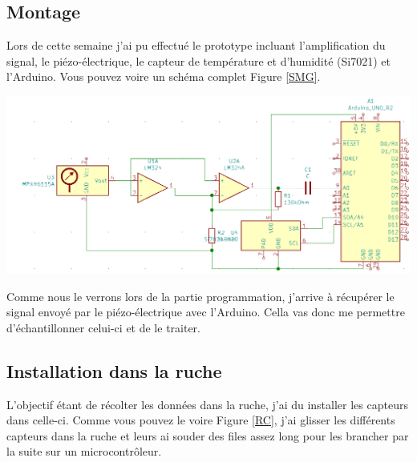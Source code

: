 \documentclass[11pt,french,a4paper]{article}
\begin{document}
\subsection{Montage}
Lors de cette semaine j'ai pu effectué le prototype incluant l'amplification du signal, le piézo-électrique, le capteur de température et d'humidité (Si7021) et l'Arduino. Vous pouvez voire un schéma complet Figure \ref{SMG}.
\\
\begin{center}
    \includegraphics[scale=0.5]{../img/SMG.png}
    \label{SMG}
\end{center}
Comme nous le verrons lors de la partie programmation, j'arrive à récupérer le signal envoyé par le piézo-électrique avec l'Arduino. Cella vas donc me permettre d'échantillonner celui-ci et de le traiter.
\subsection{Installation dans la ruche}
L'objectif étant de récolter les données dans la ruche, j'ai du installer les capteurs dans celle-ci. Comme vous pouvez le voire Figure \ref{RC}, j'ai glisser les différents capteurs dans la ruche et leurs ai souder des files assez long pour les brancher par la suite sur un microcontrôleur.
\end{document}
